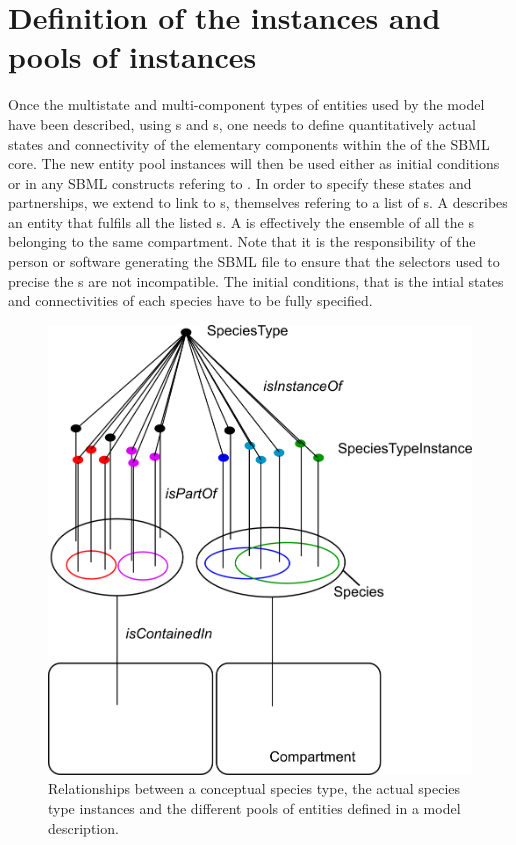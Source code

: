 \section{Definition of the instances and pools of instances}

Once the multistate and multi-component types of entities used by the model have been described, using s and s, one needs to define quantitatively actual states and connectivity of the elementary components within the  of the SBML core. The new entity pool instances will then be used either as initial conditions or in any SBML constructs refering to . In order to specify these states and partnerships, we extend  to link to s, themselves refering to a list of s. A  describes an entity that fulfils all the listed s. A  is effectively the ensemble of all the s belonging to the same compartment. Note that it is the responsibility of the person or software generating the SBML file to ensure that the selectors used to precise the s are not incompatible. The initial conditions, that is the intial states and connectivities of each species have to be fully specified.

\begin{figure}[h!]
\begin{center}
\includegraphics[scale=0.5]{./figs/pngs/Instantiation.png}
\caption{Relationships between a conceptual species type, the actual species type instances and the different pools of entities defined in a model description.}
\end{center}
\end{figure}

